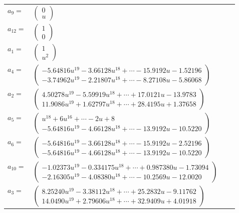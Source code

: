 \documentclass[1p]{elsarticle_modified}
\theoremstyle{definition}
\begin{document}
\begin{tabular}{m{7pt} m{180pt} m{7pt} m{180pt} }
\flushright $a_{9}=$&$\begin{pmatrix}0\\u\end{pmatrix}$ \\
\flushright $a_{12}=$&$\begin{pmatrix}1\\0\end{pmatrix}$ \\
\flushright $a_{1}=$&$\begin{pmatrix}1\\u^2\end{pmatrix}$ \\
\flushright $a_{4}=$&$\begin{pmatrix}-5.64816 u^{19}-3.66128 u^{18}+\cdots-15.9192 u-1.52196\\-3.74962 u^{19}-2.21807 u^{18}+\cdots-8.27108 u-5.86068\end{pmatrix}$ \\
\flushright $a_{2}=$&$\begin{pmatrix}4.50278 u^{19}-5.59919 u^{18}+\cdots+17.0121 u-13.9783\\11.9086 u^{19}+1.62797 u^{18}+\cdots+28.4195 u+1.37658\end{pmatrix}$ \\
\flushright $a_{5}=$&$\begin{pmatrix}u^{18}+6 u^{16}+\cdots-2 u+8\\-5.64816 u^{19}-4.66128 u^{18}+\cdots-13.9192 u-10.5220\end{pmatrix}$ \\
\flushright $a_{6}=$&$\begin{pmatrix}-5.64816 u^{19}-3.66128 u^{18}+\cdots-15.9192 u-2.52196\\-5.64816 u^{19}-4.66128 u^{18}+\cdots-13.9192 u-10.5220\end{pmatrix}$ \\
\flushright $a_{10}=$&$\begin{pmatrix}-1.02373 u^{19}-0.334175 u^{18}+\cdots+0.987380 u-1.73094\\-2.16305 u^{19}-4.08380 u^{18}+\cdots-10.2569 u-12.0020\end{pmatrix}$ \\
\flushright $a_{3}=$&$\begin{pmatrix}8.25240 u^{19}-3.38112 u^{18}+\cdots+25.2832 u-9.11762\\14.0490 u^{19}+2.79606 u^{18}+\cdots+32.9409 u+4.01918\end{pmatrix}$ \\

\end{tabular}
\end{document}
